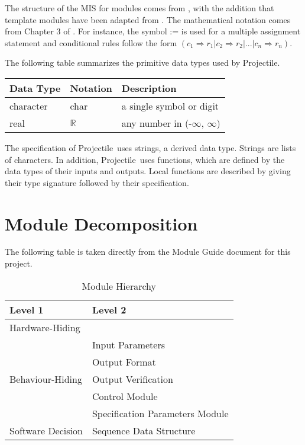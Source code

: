 \documentclass[12pt, titlepage]{article}
\newcommand{\progname}{Projectile}
\begin{document}
The structure of the MIS for modules comes from \citet{HoffmanAndStrooper1995},
with the addition that template modules have been adapted from
\cite{GhezziEtAl2003}.  The mathematical notation comes from Chapter 3 of
\citet{HoffmanAndStrooper1995}.  For instance, the symbol := is used for a
multiple assignment statement and conditional rules follow the form $(c_1
\Rightarrow r_1 | c_2 \Rightarrow r_2 | ... | c_n \Rightarrow r_n )$.

The following table summarizes the primitive data types used by \progname. 

\begin{center}
\renewcommand{\arraystretch}{1.2}
\noindent 
\begin{tabular}{l l p{7.5cm}} 
\toprule 
\textbf{Data Type} & \textbf{Notation} & \textbf{Description}\\ 
\midrule
character & char & a single symbol or digit\\
real & $\mathbb{R}$ & any number in (-$\infty$, $\infty$)\\
\bottomrule
\end{tabular} 
\end{center}

\noindent
The specification of \progname\ uses strings, a derived data type. Strings
are lists of characters. In addition, \progname\ uses functions, which
are defined by the data types of their inputs and outputs. Local functions are
described by giving their type signature followed by their specification.

\section{Module Decomposition}

The following table is taken directly from the Module Guide document for this project.

\begin{table}[h!]
\centering
\begin{tabular}{p{} p{}}
\toprule
\textbf{Level 1} & \textbf{Level 2}\\
\midrule

{Hardware-Hiding} & ~ \\
\midrule

\multirow{5}{0.3\textwidth}{Behaviour-Hiding} & Input Parameters\\
& Output Format\\
& Output Verification\\
& Control Module\\
& Specification Parameters Module\\
\midrule

\multirow{1}{0.3\textwidth}{Software Decision} & Sequence Data Structure\\
\bottomrule

\end{tabular}
\caption{Module Hierarchy}
\label{TblMH}
\end{table}
\end{document}
